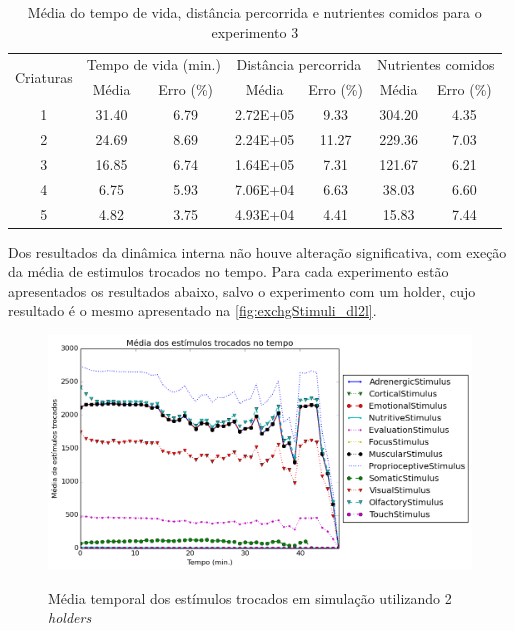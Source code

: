 \begin{table}[H]
\centering
\caption{Média do tempo de vida, distância percorrida e nutrientes comidos para o experimento 3}
\begin{tabular}{ccccccc}
\hline
\multirow{2}{*}{Criaturas} & \multicolumn{2}{c}{ Tempo de vida (min.) } & \multicolumn{2}{c}{ Distância percorrida } & \multicolumn{2}{c}{ Nutrientes comidos } \\
& Média & Erro (\%) & Média & Erro (\%) & Média & Erro (\%) \\
\hline
1 & 31.40 & 6.79 & 2.72E+05 & 9.33 & 304.20 & 4.35 \\
2 & 24.69 & 8.69 & 2.24E+05 & 11.27 & 229.36 & 7.03 \\
3 & 16.85 & 6.74 & 1.64E+05 & 7.31 & 121.67 & 6.21 \\
4 & 6.75 & 5.93 & 7.06E+04 & 6.63 & 38.03 & 6.60 \\
5 & 4.82 & 3.75 & 4.93E+04 & 4.41 & 15.83 & 7.44 \\
\hline
\end{tabular}
\label{tab:resumo_exp3}
\end{table}

Dos resultados da dinâmica interna não houve alteração significativa, com exeção da média de estimulos trocados no tempo. Para cada experimento estão apresentados os resultados abaixo, salvo o experimento com um holder, cujo resultado é o mesmo apresentado na \autoref{fig:exchgStimuli_dl2l}.
\begin{figure}[H]
  \centering
  \caption{Média temporal dos estímulos trocados em simulação utilizando 2 \textit{holders}}
  \includegraphics[scale=0.6]{04-figuras/experiments/exp_3/2/avgExchangedStimuliOverTime.png}
  \label{fig:exp_3_2_exchgStimuli}
\end{figure}

